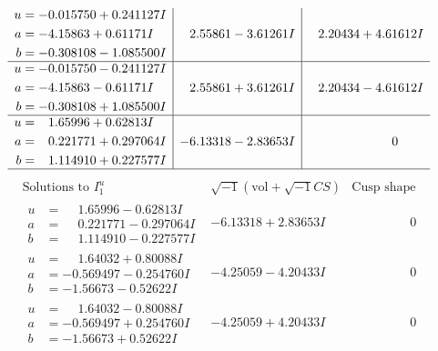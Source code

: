 \documentclass[1p]{elsarticle_modified}
\theoremstyle{definition}
\newcommand{\I}{\sqrt{-1}}
\begin{document}
$$\begin{array}{c|c|c}
\begin{aligned}
u &= -0.015750 + 0.241127 I \\
a &= -4.15863 + 0.61171 I \\
b &= -0.308108 - 1.085500 I\end{aligned}
 & \phantom{-}2.55861 - 3.61261 I & \phantom{-}2.20434 + 4.61612 I \\ \hline\begin{aligned}
u &= -0.015750 - 0.241127 I \\
a &= -4.15863 - 0.61171 I \\
b &= -0.308108 + 1.085500 I\end{aligned}
 & \phantom{-}2.55861 + 3.61261 I & \phantom{-}2.20434 - 4.61612 I \\ \hline\begin{aligned}
u &= \phantom{-}1.65996 + 0.62813 I \\
a &= \phantom{-}0.221771 + 0.297064 I \\
b &= \phantom{-}1.114910 + 0.227577 I\end{aligned}
 & -6.13318 - 2.83653 I & \phantom{-0.000000 } 0\\
 \hline 
 \end{array}$$\newpage$$\begin{array}{c|c|c}  
\text{Solutions to }I^u_{1}& \I (\text{vol} + \sqrt{-1}CS) & \text{Cusp shape}\\
 \hline 
\begin{aligned}
u &= \phantom{-}1.65996 - 0.62813 I \\
a &= \phantom{-}0.221771 - 0.297064 I \\
b &= \phantom{-}1.114910 - 0.227577 I\end{aligned}
 & -6.13318 + 2.83653 I & \phantom{-0.000000 } 0 \\ \hline\begin{aligned}
u &= \phantom{-}1.64032 + 0.80088 I \\
a &= -0.569497 - 0.254760 I \\
b &= -1.56673 - 0.52622 I\end{aligned}
 & -4.25059 - 4.20433 I & \phantom{-0.000000 } 0 \\ \hline\begin{aligned}
u &= \phantom{-}1.64032 - 0.80088 I \\
a &= -0.569497 + 0.254760 I \\
b &= -1.56673 + 0.52622 I\end{aligned}
 & -4.25059 + 4.20433 I & \phantom{-0.000000 } 0 \\ \hline\begin{aligned}

\end{aligned}
\end{array}$$
\end{document}
